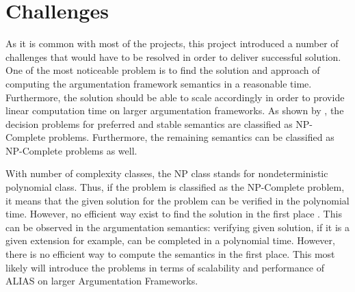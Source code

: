 \section{Challenges}
As it is common with most of the projects, this project introduced a number of challenges that would have to be resolved in order to deliver successful solution. One of the most noticeable problem is to find the solution and approach of computing the argumentation framework semantics in a reasonable time. Furthermore, the solution should be able to scale accordingly in order to provide linear computation time on larger argumentation frameworks. As shown by \citet{complexity}, the decision problems for preferred and stable semantics are classified as NP-Complete problems. Furthermore, the remaining semantics can be classified as NP-Complete problems as well.

With number of complexity classes, the NP class stands for nondeterministic polynomial class. Thus, if the problem is classified as the NP-Complete problem, it means that the given solution for the problem can be verified in the polynomial time. However, no efficient way exist to find the solution in the first place \citep{arora2009computational}. This can be observed in the argumentation semantics: verifying given solution, if it is a given extension for example, can be completed in a polynomial time. However, there is no efficient way to compute the semantics in the first place. This most likely will introduce the problems in terms of scalability and performance of ALIAS on larger Argumentation Frameworks. 